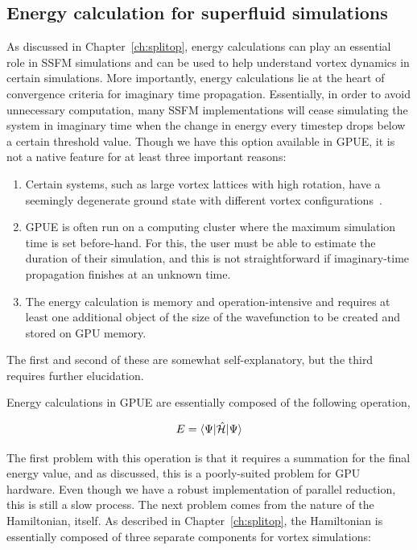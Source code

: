 \subsection{Energy calculation for superfluid simulations}

As discussed in Chapter~\ref{ch:splitop}, energy calculations can play an essential role in SSFM simulations and can be used to help understand vortex dynamics in certain simulations.
More importantly, energy calculations lie at the heart of convergence criteria for imaginary time propagation.
Essentially, in order to avoid unnecessary computation, many SSFM implementations will cease simulating the system in imaginary time when the change in energy every timestep drops below a certain threshold value.
Though we have this option available in GPUE, it is not a native feature for at least three important reasons:

\begin{enumerate}
\item Certain systems, such as large vortex lattices with high rotation, have a seemingly degenerate ground state with different vortex configurations~\cite{o2017, o2016, o2016topo}.
\item GPUE is often run on a computing cluster where the maximum simulation time is set before-hand.
For this, the user must be able to estimate the duration of their simulation, and this is not straightforward if imaginary-time propagation finishes at an unknown time.
\item The energy calculation is memory and operation-intensive and requires at least one additional object of the size of the wavefunction to be created and stored on GPU memory.
\end{enumerate}

\noindent The first and second of these are somewhat self-explanatory, but the third requires further elucidation.

Energy calculations in GPUE are essentially composed of the following operation,

\begin{equation}
E = \braket{\Psi|\mathcal{\hat H}|\Psi}
\end{equation}

\noindent The first problem with this operation is that it requires a summation for the final energy value, and as discussed, this is a poorly-suited problem for GPU hardware.
Even though we have a robust implementation of parallel reduction, this is still a slow process.
The next problem comes from the nature of the Hamiltonian, itself.
As described in Chapter~\ref{ch:splitop}, the Hamiltonian is essentially composed of three separate components for vortex simulations:

